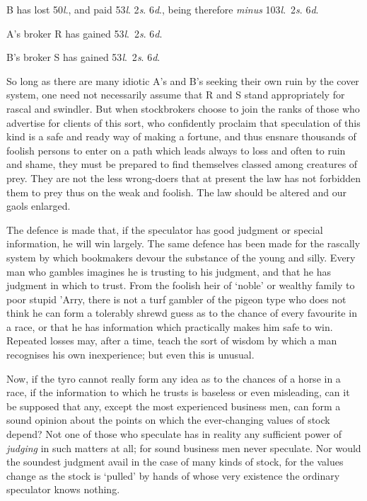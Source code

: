 \documentclass[letterpaper,12pt,oneside,openany]{memoir}
\begin{document}
B has lost 50\textit{l}., and paid 53\textit{l}. 2\textit{s}. 6\textit{d}.,
being therefore \emph{minus} 103\textit{l}.\ 2\textit{s}. 6\textit{d}.

A's broker R has gained 53\textit{l}.\ 2\textit{s}. 6\textit{d}.

B's broker S has gained 53\textit{l}.\ 2\textit{s}. 6\textit{d}.

So long as there are many idiotic A's and B's seeking
their own ruin by the cover system, one need not necessarily
assume that R and S stand appropriately for
rascal and swindler. But when stockbrokers choose to
join the ranks of those who advertise for clients of this
sort, who confidently proclaim that speculation of this
kind is a safe and ready way of making a fortune, and
thus ensnare thousands of foolish persons to enter on a
path which leads always to loss and often to ruin and
shame, they must be prepared to find themselves classed
among creatures of prey. They are not the less
wrong-doers that at present the law has not forbidden
them to prey thus on the weak and foolish. The law
should be altered and our gaols enlarged.

The defence is made that, if the speculator has good
judgment or special information, he will win largely.
The same defence has been made for the rascally system
by which bookmakers devour the substance of the young
and silly. Every man who gambles imagines he is
trusting to his judgment, and that he has judgment in
which to trust. From the foolish heir of `noble' or
wealthy family to poor stupid 'Arry, there is not a turf
gambler of the pigeon type who does not think he can
form a tolerably shrewd guess as to the chance of every
favourite in a race, or that he has information which
practically makes him safe to win. Repeated losses may,
after a time, teach the sort of wisdom by which a man
recognises his own inexperience; but even this is unusual.

Now, if the tyro cannot really form any idea as to
the chances of a horse in a race, if the information to
which he trusts is baseless or even misleading, can it
be supposed that any, except the most experienced
business men, can form a sound opinion about the
points on which the ever-changing values of stock
depend? Not one of those who speculate has in reality
any sufficient power of \emph{judging} in such matters at all;
for sound business men never speculate. Nor would
the soundest judgment avail in the case of many kinds
of stock, for the values change as the stock is `pulled'
by hands of whose very existence the ordinary speculator
knows nothing.
\end{document}
